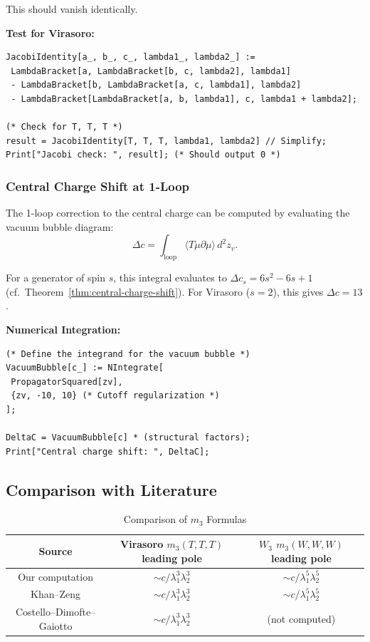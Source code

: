 This should vanish identically.

\textbf{Test for Virasoro:}
\begin{verbatim}
JacobiIdentity[a_, b_, c_, lambda1_, lambda2_] :=
 LambdaBracket[a, LambdaBracket[b, c, lambda2], lambda1]
 - LambdaBracket[b, LambdaBracket[a, c, lambda1], lambda2]
 - LambdaBracket[LambdaBracket[a, b, lambda1], c, lambda1 + lambda2];

(* Check for T, T, T *)
result = JacobiIdentity[T, T, T, lambda1, lambda2] // Simplify;
Print["Jacobi check: ", result]; (* Should output 0 *)
\end{verbatim}

\subsubsection{Central Charge Shift at 1-Loop}

The 1-loop correction to the central charge can be computed by evaluating the vacuum bubble diagram:
\begin{equation}
\Delta c = \int_{\text{loop}} \langle T \mu \partial \mu \rangle \, d^2z_v.
\end{equation}

For a generator of spin $s$, this integral evaluates to $\Delta c_s = 6s^2 - 6s + 1$ (cf.\ Theorem~\ref{thm:central-charge-shift}). For Virasoro ($s=2$), this gives $\Delta c = 13$.

\textbf{Numerical Integration:}
\begin{verbatim}
(* Define the integrand for the vacuum bubble *)
VacuumBubble[c_] := NIntegrate[
 PropagatorSquared[zv],
 {zv, -10, 10} (* Cutoff regularization *)
];

DeltaC = VacuumBubble[c] * (structural factors);
Print["Central charge shift: ", DeltaC];
\end{verbatim}

\subsection{Comparison with Literature}

\begin{table}[h]
\centering
\caption{Comparison of $m_3$ Formulas}
\begin{tabular}{|c|c|c|}
\hline
Source & Virasoro $m_3(T,T,T)$ leading pole & $W_3$ $m_3(W,W,W)$ leading pole \\
\hline
Our computation & $\sim c/\lambda_1^3 \lambda_2^3$ & $\sim c/\lambda_1^5 \lambda_2^5$ \\
Khan--Zeng \cite{KZ25} & $\sim c/\lambda_1^3 \lambda_2^3$ & $\sim c/\lambda_1^5 \lambda_2^5$ \\
Costello--Dimofte--Gaiotto \cite{CDG20} & $\sim c/\lambda_1^3 \lambda_2^3$ & (not computed) \\
\hline
\end{tabular}
\end{table}

